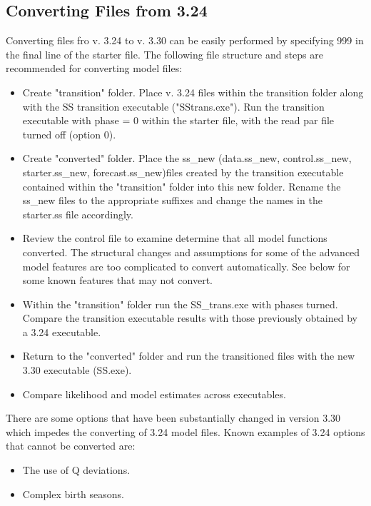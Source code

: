 \subsection{Converting Files from 3.24}
Converting files fro v. 3.24 to v. 3.30 can be easily performed by specifying 999 in the final line of the starter file.  The following file structure and steps are recommended for converting model files:
\begin{itemize}
	\item Create "transition" folder.  Place v. 3.24 files within the transition folder along with the SS transition executable ("SStrans.exe").  Run the transition executable with phase = 0 within the starter file, with the read par file turned off (option 0).
	\item Create "converted" folder.  Place the ss\_new (data.ss\_new, control.ss\_new, starter.ss\_new, forecast.ss\_new)files created by the transition executable contained within the "transition" folder into this new folder.  Rename the ss\_new files to the appropriate suffixes and change the names in the starter.ss file accordingly.
	\item Review the control file to examine determine that all model functions converted.  The structural changes and assumptions for some of the advanced model features are too complicated to convert automatically.  See below for some known features that may not convert.
	\item Within the "transition" folder run the SS\_trans.exe with phases turned.  Compare the transition executable results with those previously obtained by a 3.24 executable.
	\item Return to the "converted" folder and run the transitioned files with the new 3.30 executable (SS.exe).
	\item Compare likelihood and model estimates across executables.
\end{itemize}

There are some options that have been substantially changed in version 3.30 which impedes the converting of 3.24 model files.  Known examples of 3.24 options that cannot be converted are:
\begin{itemize}
	\item The use of Q deviations.
	\item Complex birth seasons.
\end{itemize}